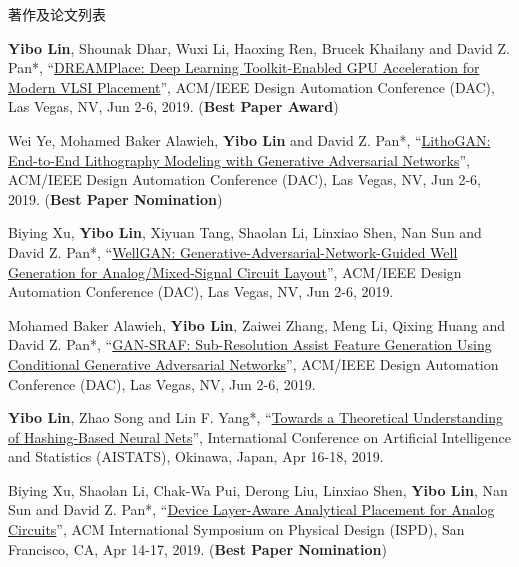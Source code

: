 \begin{rSection}{著作及论文列表}
\begin{description}[font=\normalfont, rightmargin=2em]
\item[{[C42]}]{
        \textbf{Yibo Lin}, Shounak Dhar, Wuxi Li, Haoxing Ren, Brucek Khailany and David Z. Pan*, 
    ``\href{https://doi.org/10.1145/3316781.3317803}{DREAMPlace: Deep Learning Toolkit-Enabled GPU Acceleration for Modern VLSI Placement}'', 
    ACM/IEEE Design Automation Conference (DAC), Las Vegas, NV, Jun 2-6, 2019.
    (\textbf{Best Paper Award})
}
            

\item[{[C41]}]{
        Wei Ye, Mohamed Baker Alawieh, \textbf{Yibo Lin} and David Z. Pan*, 
    ``\href{https://doi.org/10.1145/3316781.3317852}{LithoGAN: End-to-End Lithography Modeling with Generative Adversarial Networks}'', 
    ACM/IEEE Design Automation Conference (DAC), Las Vegas, NV, Jun 2-6, 2019.
    (\textbf{Best Paper Nomination})
}
            

\item[{[C40]}]{
        Biying Xu, \textbf{Yibo Lin}, Xiyuan Tang, Shaolan Li, Linxiao Shen, Nan Sun and David Z. Pan*, 
    ``\href{https://doi.org/10.1145/3316781.3317930}{WellGAN: Generative-Adversarial-Network-Guided Well Generation for Analog/Mixed-Signal Circuit Layout}'', 
    ACM/IEEE Design Automation Conference (DAC), Las Vegas, NV, Jun 2-6, 2019.
    
}
            

\item[{[C39]}]{
        Mohamed Baker Alawieh, \textbf{Yibo Lin}, Zaiwei Zhang, Meng Li, Qixing Huang and David Z. Pan*, 
    ``\href{https://doi.org/10.1145/3316781.3317832}{GAN-SRAF: Sub-Resolution Assist Feature Generation Using Conditional Generative Adversarial Networks}'', 
    ACM/IEEE Design Automation Conference (DAC), Las Vegas, NV, Jun 2-6, 2019.
    
}
            

\item[{[C38]}]{
        \textbf{Yibo Lin}, Zhao Song and Lin F. Yang*, 
    ``\href{https://arxiv.org/abs/1812.10244}{Towards a Theoretical Understanding of Hashing-Based Neural Nets}'', 
    International Conference on Artificial Intelligence and Statistics (AISTATS), Okinawa, Japan, Apr 16-18, 2019.
    
}
            

\item[{[C37]}]{
        Biying Xu, Shaolan Li, Chak-Wa Pui, Derong Liu, Linxiao Shen, \textbf{Yibo Lin}, Nan Sun and David Z. Pan*, 
    ``\href{https://doi.org/10.1145/3299902.3309751}{Device Layer-Aware Analytical Placement for Analog Circuits}'', 
    ACM International Symposium on Physical Design (ISPD), San Francisco, CA, Apr 14-17, 2019.
    (\textbf{Best Paper Nomination})
}
            


\end{description}
\end{rSection}
